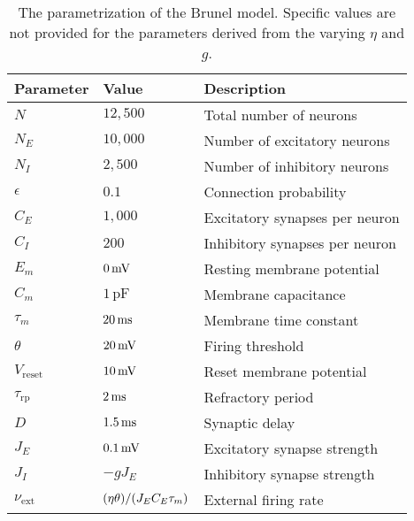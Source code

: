 \begin{table}[!htb]
  \caption{The parametrization of the Brunel model. Specific values are not provided for the parameters derived from the varying $\eta$ and $g$.}
  \begin{center}
    \begin{tabular}{lll}
      \toprule
      \textbf{Parameter} & \textbf{Value} & \textbf{Description} \\
      \midrule
      $N$ & $12,500$ & Total number of neurons
      \\
      $N_E$ & $10,000$ & Number of excitatory neurons
      \\
      $N_I$ & $2,500$ & Number of inhibitory neurons
      \\
      $\epsilon$ & $0.1$ & Connection probability
      \\
      $C_E$ & $1,000$ & Excitatory synapses per neuron
      \\
      $C_I$ & $200$ & Inhibitory synapses per neuron
      \\
      $E_m$ &  $0 \,\mathrm{mV}$ & Resting membrane potential 
      \\
      $C_m$ &  $1 \, \mathrm{pF}$ & Membrane capacitance
      \\
      $\tau_m$ &  $20 \,\mathrm{ms}$ & Membrane time constant
      \\
      $\theta$ &  $20 \,\mathrm{mV}$ & Firing threshold
      \\
      $V_\mathrm{reset}$ &  $10 \,\mathrm{mV}$ & Reset membrane potential
      \\
      $\tau_\mathrm{rp}$ &  $2 \,\mathrm{ms}$ & Refractory period
      \\
      $D$ &  $1.5 \,\mathrm{ms}$ & Synaptic delay
      \\
      $J_E$ &  $0.1 \,\mathrm{mV}$ & Excitatory synapse strength
      \\
      $J_I$ &  $-g J_E$ & Inhibitory synapse strength
      \\
      $\nu_\mathrm{ext}$ &  $\qty(\eta \theta)/\qty(J_E C_E \tau_m)$ & External firing rate
      \\
      \bottomrule
    \end{tabular}
  \end{center}
  \label{tab:bnet_model_parameters}
\end{table}
